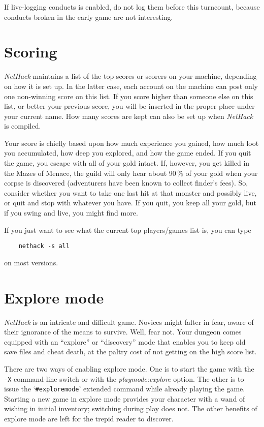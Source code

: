 \item[\ib{LLC\_TURNS}]
If live-logging conducts is enabled, do not log them before this turncount,
because conducts broken in the early game are not interesting.
\elist

\section{Scoring}

{\it NetHack\/} maintains a list of the top scores or scorers on your machine,
depending on how it is set up.  In the latter case, each account on
the machine can post only one non-winning score on this list.  If
you score higher than someone else on this list, or better your
previous score, you will be inserted in the proper place under your
current name.  How many scores are kept can also be set up when
{\it NetHack\/} is compiled.

Your score is chiefly based upon how much experience you gained, how
much loot you accumulated, how deep you explored, and how the game
ended.  If you quit the game, you escape with all of your gold intact.
If, however, you get killed in the Mazes of Menace, the guild will
only hear about 90\,\% of your gold when your corpse is discovered
(adventurers have been known to collect finder's fees).  So, consider
whether you want to take one last hit at that monster and possibly
live, or quit and stop with whatever you have.  If you quit, you keep
all your gold, but if you swing and live, you might find more.

If you just want to see what the current top players/games list is, you
can type
\begin{verbatim}
    nethack -s all
\end{verbatim}
on most versions.

\section{Explore mode}

{\it NetHack\/} is an intricate and difficult game.  Novices might falter
in fear, aware of their ignorance of the means to survive.  Well, fear
not.  Your dungeon comes equipped with an ``explore'' or ``discovery''
mode that enables you to keep old save files and cheat death, at the
paltry cost of not getting on the high score list.

There are two ways of enabling explore mode.  One is to start the game
with the {\tt -X}
command-line switch or with the
{\it playmode:explore\/}
option.  The other is to issue the `{\tt \#exploremode}' extended command while
already playing the game.  Starting a new game in explore mode provides your
character with a wand of wishing in initial inventory; switching
during play does not.  The other benefits of explore mode are left for
the trepid reader to discover.

